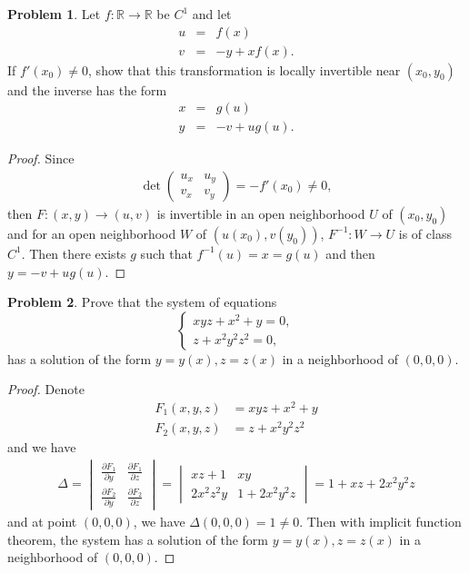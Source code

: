 \documentclass[11pt]{article}
\theoremstyle{definition}
\newtheorem{problem}{Problem}
\theoremstyle{definition}
\begin{document}
\begin{problem}
Let $f:\mathbb{R}\to\mathbb{R}$ be $C^1$ and let
\begin{eqnarray*}
u & = & f(x) \\
v & = & -y+xf(x).
\end{eqnarray*}
If $f'(x_0)\neq 0$, show that this transformation is locally
invertible near $(x_0,y_0)$ and the inverse has the form
\begin{eqnarray*}
x & = & g(u) \\
y & = & -v+ug(u).
\end{eqnarray*}
\end{problem}
\begin{proof}
Since 
\begin{align*}
    \det \begin{pmatrix}
        u_x & u_y \\
        v_x & v_y
    \end{pmatrix} = - f'(x_0) \neq 0,
\end{align*}
then $F: (x,y) \to (u,v)$ is invertible in an open neighborhood $U$ of $(x_0,y_0)$ and for an open neighborhood $W$ of $(u(x_0),v(y_0))$, $F^{-1}: W\to U$ is of class $C^1$. Then there exists $g$ such that $f^{-1}(u) = x = g(u)$ and then $y = -v + ug(u)$.
\end{proof}

\medskip

\begin{problem}
Prove that the system of equations
$$
\begin{cases}
xyz+x^2+y = 0,\\
z+x^2y^2z^2 = 0,
\end{cases}
$$
has a solution of the form $y=y(x), z=z(x)$ in a neighborhood of
$(0,0,0)$.
\end{problem}
\begin{proof}
Denote 
\begin{align*}
    F_1(x,y,z) & = xyz + x^2 + y \\
    F_2(x,y,z) & = z + x^2y^2z^2
\end{align*}
and we have
\begin{align*}
    \Delta = \begin{vmatrix}
        \frac{\partial F_1}{\partial y} & \frac{\partial F_1}{\partial z} \\
        \frac{\partial F_2}{\partial y} & \frac{\partial F_2}{\partial z}
    \end{vmatrix} = \begin{vmatrix}
        xz + 1 & xy \\
        2 x^2 z^2 y & 1 + 2 x^2 y^2 z
    \end{vmatrix} = 1 + xz + 2 x^2 y^2 z
\end{align*}
and at point $(0,0,0)$, we have $\Delta(0,0,0) = 1 \neq 0$. Then with implicit function theorem, the system has a solution of the form $y=y(x), z=z(x)$ in a neighborhood of
$(0,0,0)$.
\end{proof}
\end{document}
